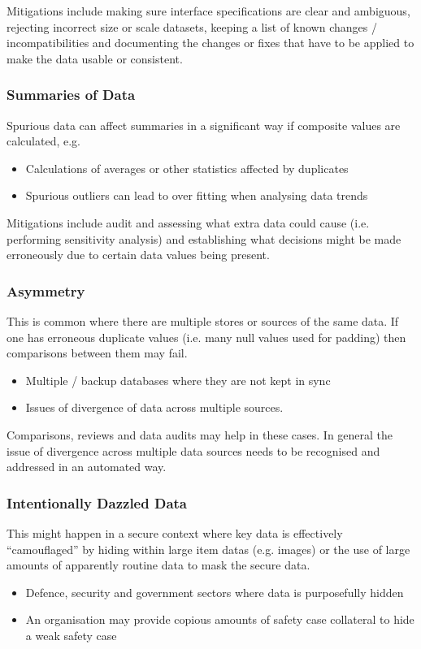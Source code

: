 Mitigations include making sure interface specifications are clear and ambiguous, rejecting incorrect size or scale \glspl{dataset}, keeping a list of known changes / incompatibilities and documenting the changes or fixes that have to be applied to make the data usable or consistent.

\subsubsection{Summaries of Data}
Spurious data can affect summaries in a significant way if composite values are calculated, e.g.
\begin{itemize}
    \item Calculations of averages or other statistics affected by duplicates
    \item Spurious outliers can lead to over fitting when analysing data trends
\end{itemize}

Mitigations include audit and assessing what extra data could cause (i.e. performing sensitivity analysis) and establishing what decisions might be made erroneously due to certain data values being present.	

\subsubsection{ Asymmetry}
This is common where there are multiple stores or sources of the same data. If one has erroneous duplicate values (i.e. many null values used for padding) then comparisons between them may fail.
\begin{itemize}
    \item Multiple / backup \glspl{database} where they are not kept in sync
    \item Issues of divergence of data across multiple sources.
\end{itemize}

Comparisons, reviews and data audits may help in these cases. In general the issue of divergence across multiple data sources needs to be recognised and addressed in an automated way.

\subsubsection{Intentionally Dazzled Data}
This might happen in a secure context where key data is effectively ``camouflaged'' by hiding within large \glspl{item data} (e.g. images) or the use of large amounts of apparently routine data to mask the secure data.
\begin{itemize}
    \item Defence, security and government sectors where data is purposefully hidden 
    \item An organisation may provide copious amounts of safety case collateral to hide a weak safety case
\end{itemize}
